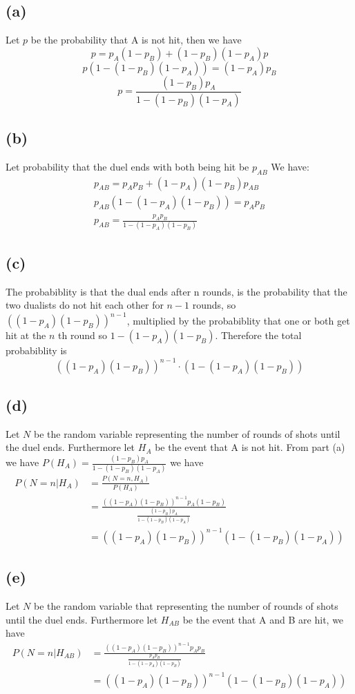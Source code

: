 \subsection*{(a)}
Let $p$ be the probability that A is not hit, then we have
$$p=p_A(1-p_B)+(1-p_B)(1-p_A)p$$
$$p(1-(1-p_B)(1-p_A))=(1-p_A)p_B$$
$$p=\boxed{\frac{(1-p_B)p_A}{1-(1-p_B)(1-p_A)}}$$
\subsection*{(b)}
Let probability that the duel ends with both being hit be $p_{AB}$
We have:
\begin{align*}
    p_{AB}=p_Ap_B+(1-p_A)(1-p_B)p_{AB}\\
    p_{AB}\left(1-(1-p_A)(1-p_B)\right)=p_Ap_B\\
    p_{AB}=\boxed{\frac{p_Ap_B}{1-(1-p_A)(1-p_B)}}
\end{align*}
\subsection*{(c)}
The probabiblity is that the dual ends after n rounds, is the probability
that the two dualists do not hit each other for $n-1$ rounds, so $\left((1-p_A)(1-p_B)\right)^{n-1}$,
multiplied by the probabiblity that one or both get hit at the $n$ th round
so $1-(1-p_A)(1-p_B)$. Therefore the total probabiblity is 
$$\boxed{\left((1-p_A)(1-p_B)\right)^{n-1}\cdot(1-(1-p_A)(1-p_B))}$$
\subsection*{(d)}
Let $N$ be the random variable representing the number of rounds
of shots until the duel ends. Furthermore let $H_A$ be the event that A is not hit. 
From part (a) we have $P(H_A)=\frac{(1-p_B)p_A}{1-(1-p_B)(1-p_A)}$
we have
\begin{align*}
    P(N=n|H_A)&=\frac{P(N=n,H_A)}{P(H_A)}\\
    &=\frac{\left((1-p_A)(1-p_B)\right)^{n-1}p_A(1-p_B)}{\frac{(1-p_B)p_A}{1-(1-p_B)(1-p_A)}}\\
    &=\boxed{\left((1-p_A)(1-p_B)\right)^{n-1}\left(1-(1-p_B)(1-p_A)\right)}
\end{align*}
\subsection*{(e)}
Let $N$ be the random variable that representing the number of rounds
of shots until the duel ends. Furthermore let $H_{AB}$ be the event that A and B are hit, we have
\begin{align*}
    P(N=n|H_{AB})&=\frac{\left((1-p_A)(1-p_B)\right)^{n-1}p_Ap_B}{\frac{p_Ap_B}{1-(1-p_A)(1-p_B)}}\\
    &=\boxed{\left((1-p_A)(1-p_B)\right)^{n-1}\left(1-(1-p_B)(1-p_A)\right)}
\end{align*}

